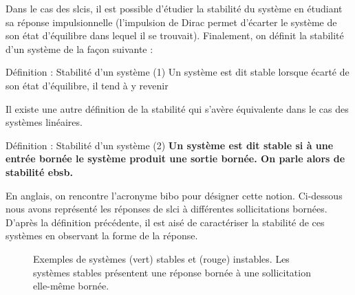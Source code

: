 Dans le cas des \glspl{slci}, il est possible d'étudier la stabilité du système 
en étudiant sa réponse impulsionnelle (l'impulsion de Dirac permet d'écarter 
le système de son état d'équilibre dans lequel il se trouvait). 
Finalement, on définit la stabilité d'un système de la façon 
suivante :
\begin{definition}{Définition : Stabilité d'un système (1)}
Un système est dit stable lorsque écarté de son état d'équilibre, il 
tend à y revenir
\end{definition}
Il existe une autre définition de la stabilité qui s'avère équivalente 
dans le cas des systèmes linéaires.
\begin{definition}{Définition : Stabilité d'un système (2)}
\textbf{Un système est dit stable si à une entrée bornée le système produit 
une sortie bornée. On parle alors de stabilité \gls{ebsb}.}
\end{definition}
En anglais, on rencontre l'acronyme \gls{bibo} pour désigner cette notion.
Ci-dessous nous avons représenté les réponses de \gls{slci} à différentes
sollicitations bornées. D'après la définition précédente, il est aisé
de caractériser la stabilité de ces systèmes en observant la forme de la 
réponse.
\begin{figure}[!t]
    \centering
    
    \caption{Exemples de systèmes (vert) stables et (rouge) instables. Les 
    systèmes stables présentent une réponse bornée à une sollicitation elle-même
    bornée.}
\end{figure}
\newpage
